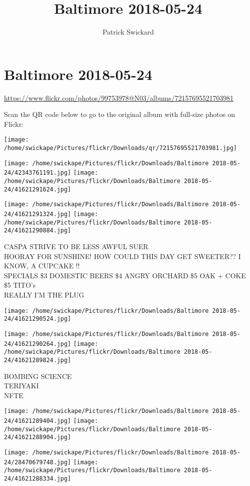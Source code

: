 \documentclass[10pt,letterpaper]{article}
\title{Baltimore 2018-05-24}
\author{Patrick Swickard}
\date{}
\begin{document}
\section*{Baltimore 2018-05-24}

\url{https://www.flickr.com/photos/99753978@N03/albums/72157695521703981}

Scan the QR code below to go to the original album with full-size photos on Flickr:

\texttt{[image: /home/swickape/Pictures/flickr/Downloads/qr/72157695521703981.jpg]}
\pagebreak

\texttt{[image: /home/swickape/Pictures/flickr/Downloads/Baltimore 2018-05-24/42343761191.jpg]}
\texttt{[image: /home/swickape/Pictures/flickr/Downloads/Baltimore 2018-05-24/41621291624.jpg]}

\texttt{[image: /home/swickape/Pictures/flickr/Downloads/Baltimore 2018-05-24/41621291324.jpg]}
\texttt{[image: /home/swickape/Pictures/flickr/Downloads/Baltimore 2018-05-24/41621290884.jpg]}

CASPA STRIVE TO BE LESS AWFUL SUER\\
HOORAY FOR SUNSHINE!  HOW COULD THIS DAY GET SWEETER??  I KNOW, A CUPCAKE !!\\
SPECIALS \$3 DOMESTIC BEERS \$4 ANGRY ORCHARD \$5 OAK + COKE \$5 TITO's\\
REALLY I'M THE PLUG
\pagebreak

\texttt{[image: /home/swickape/Pictures/flickr/Downloads/Baltimore 2018-05-24/41621290524.jpg]}

\vspace{0.25in}
\texttt{[image: /home/swickape/Pictures/flickr/Downloads/Baltimore 2018-05-24/41621290264.jpg]}
\texttt{[image: /home/swickape/Pictures/flickr/Downloads/Baltimore 2018-05-24/41621289824.jpg]}

BOMBING SCIENCE\\
TERIYAKI\\
NFTE
\pagebreak

\texttt{[image: /home/swickape/Pictures/flickr/Downloads/Baltimore 2018-05-24/41621289404.jpg]}
\texttt{[image: /home/swickape/Pictures/flickr/Downloads/Baltimore 2018-05-24/41621288904.jpg]}

\texttt{[image: /home/swickape/Pictures/flickr/Downloads/Baltimore 2018-05-24/28470679748.jpg]}
\texttt{[image: /home/swickape/Pictures/flickr/Downloads/Baltimore 2018-05-24/41621288334.jpg]}
\end{document}
